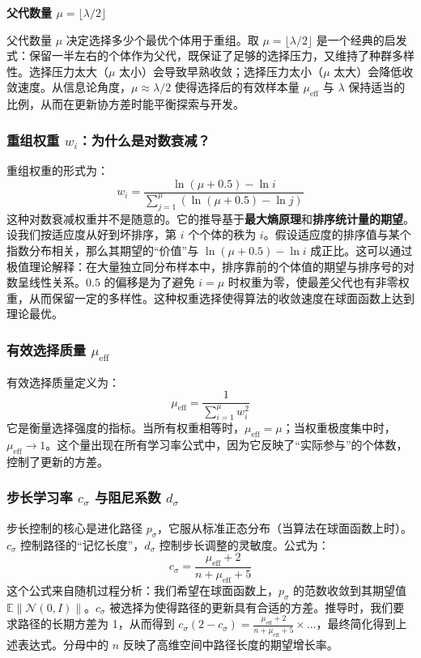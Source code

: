 \documentclass[lang=cn,zihao=-4,a4paper,fontset=windows]{beautybook}
\begin{document}
\textbf{父代数量 $\mu = \lfloor \lambda/2 \rfloor$}

父代数量 $\mu$ 决定选择多少个最优个体用于重组。取 $\mu = \lfloor \lambda/2 \rfloor$ 是一个经典的启发式：保留一半左右的个体作为父代，既保证了足够的选择压力，又维持了种群多样性。选择压力太大（$\mu$ 太小）会导致早熟收敛；选择压力太小（$\mu$ 太大）会降低收敛速度。从信息论角度，$\mu \approx \lambda/2$ 使得选择后的有效样本量 $\mu_{\text{eff}}$ 与 $\lambda$ 保持适当的比例，从而在更新协方差时能平衡探索与开发。

\subsubsection{重组权重 $w_i$：为什么是对数衰减？}

重组权重的形式为：
\[
w_i = \frac{\ln(\mu+0.5) - \ln i}{\sum_{j=1}^{\mu} (\ln(\mu+0.5) - \ln j)}
\]
这种对数衰减权重并不是随意的。它的推导基于\textbf{最大熵原理}和\textbf{排序统计量的期望}。设我们按适应度从好到坏排序，第 $i$ 个个体的秩为 $i$。假设适应度的排序值与某个指数分布相关，那么其期望的“价值”与 $\ln(\mu+0.5) - \ln i$ 成正比。这可以通过极值理论解释：在大量独立同分布样本中，排序靠前的个体值的期望与排序号的对数呈线性关系。$0.5$ 的偏移是为了避免 $i=\mu$ 时权重为零，使最差父代也有非零权重，从而保留一定的多样性。这种权重选择使得算法的收敛速度在球面函数上达到理论最优。

\subsubsection{有效选择质量 $\mu_{\text{eff}}$}

有效选择质量定义为：
\[
\mu_{\text{eff}} = \frac{1}{\sum_{i=1}^{\mu} w_i^2}
\]
它是衡量选择强度的指标。当所有权重相等时，$\mu_{\text{eff}} = \mu$；当权重极度集中时，$\mu_{\text{eff}} \to 1$。这个量出现在所有学习率公式中，因为它反映了“实际参与”的个体数，控制了更新的方差。

\subsubsection{步长学习率 $c_\sigma$ 与阻尼系数 $d_\sigma$}

步长控制的核心是进化路径 $p_\sigma$，它服从标准正态分布（当算法在球面函数上时）。$c_\sigma$ 控制路径的“记忆长度”，$d_\sigma$ 控制步长调整的灵敏度。公式为：
\[
c_\sigma = \frac{\mu_{\text{eff}}+2}{n+\mu_{\text{eff}}+5}
\]
这个公式来自随机过程分析：我们希望在球面函数上，$p_\sigma$ 的范数收敛到其期望值 $\mathbb{E}\|\mathcal{N}(0,I)\|$。$c_\sigma$ 被选择为使得路径的更新具有合适的方差。推导时，我们要求路径的长期方差为 1，从而得到 $c_\sigma(2-c_\sigma) = \frac{\mu_{\text{eff}}+2}{n+\mu_{\text{eff}}+5} \times \dots$，最终简化得到上述表达式。分母中的 $n$ 反映了高维空间中路径长度的期望增长率。
\end{document}
